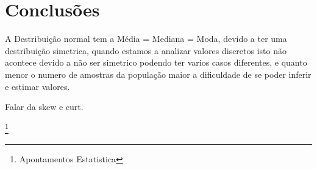 \section{Conclusões}\label{Conclusão}
A Destribuição normal tem a Média = Mediana = Moda, devido a ter uma destribuição simetrica, quando estamos a analizar valores discretos isto não acontece devido a não ser simetrico podendo ter varios casos diferentes, e quanto menor o numero de amostras da população maior a dificuldade de se poder inferir e estimar valores.

Falar da skew e curt.


%
%
%
\listoffigures
\cite{*}

\footnote{Apontamentos Estatistica}

